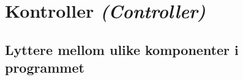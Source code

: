 \section{Kontroller \emph{(Controller)}} \label{sec:kontroller}

\subsection{Lyttere mellom ulike komponenter i programmet} \label{sec:kontrollerlyttere}